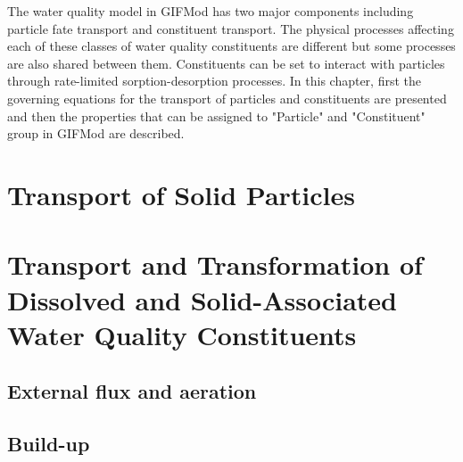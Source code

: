 The water quality model in GIFMod has two major components including particle fate transport and constituent transport. The physical processes affecting each of these classes of water quality constituents are different but some processes are also shared between them. Constituents can be set to interact with particles through rate-limited sorption-desorption processes. In this chapter, first the governing equations for the transport of particles and constituents are presented and then the properties that can be assigned to "Particle" and "Constituent" group in GIFMod are described. 
\section{Transport of Solid Particles}


\section{Transport and Transformation of Dissolved and Solid-Associated Water Quality Constituents}


\subsection{External flux and aeration}\label{sssec:ExtFlux}


\subsection{Build-up}\label{sssec:Buildup}

